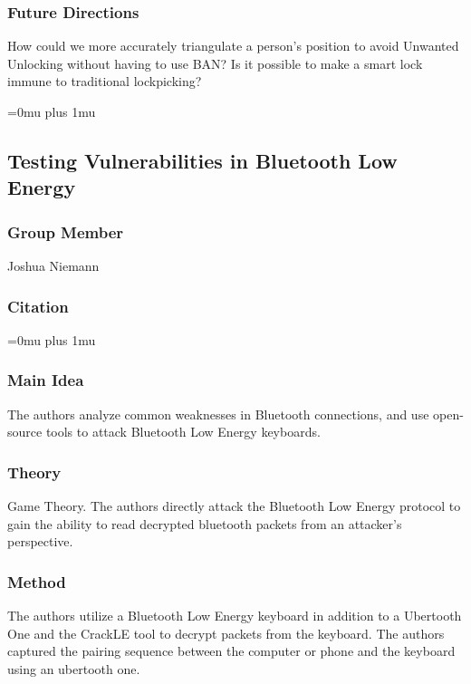 \subsubsection{Future Directions}

\noindent
How could we more accurately triangulate a person's position to avoid Unwanted Unlocking without having to use BAN? Is it possible to make a smart lock immune to traditional lockpicking?

\Urlmuskip=0mu plus 1mu\relax

\noindent
\subsection{Testing Vulnerabilities in Bluetooth Low Energy}

\subsubsection{Group Member}

\noindent
Joshua Niemann
\noindent
\subsubsection{Citation}

\Urlmuskip=0mu plus 1mu\relax

\subsubsection{Main Idea}

\noindent
The authors analyze common weaknesses in Bluetooth connections, and use open-source tools to attack Bluetooth Low Energy keyboards.

\subsubsection{Theory}

\noindent
Game Theory.  The authors directly attack the Bluetooth Low Energy protocol to gain the ability to read decrypted bluetooth packets from an attacker's perspective.

\subsubsection{Method}

\noindent
The authors utilize a Bluetooth Low Energy keyboard in addition to a Ubertooth One and the CrackLE tool to decrypt packets from the keyboard.  The authors captured the pairing sequence between the computer or phone and the keyboard using an ubertooth one.

